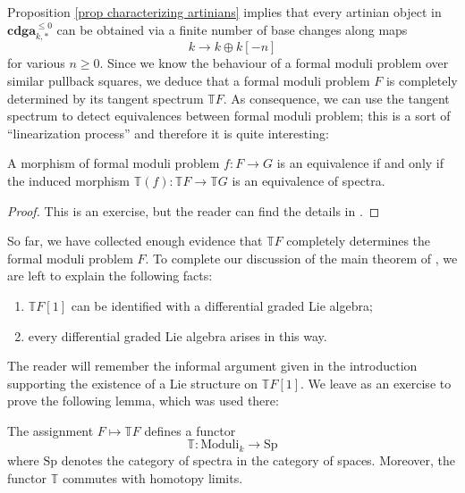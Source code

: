 \begin{refsection}
Proposition \ref{prop characterizing artinians} implies that every artinian object in $\mathbf{cdga}_{k,*}^{\le 0}$ can be obtained via a finite number of base changes along maps
\[
k \to k \oplus k[-n]
\]
for various $n \ge 0$. Since we know the behaviour of a formal moduli problem over similar pullback squares, we deduce that a formal moduli problem $F$ is completely determined by its tangent spectrum $\mathbb T F$. As consequence, we can use the tangent spectrum to detect equivalences between formal moduli problem; this is a sort of ``linearization process'' and therefore it is quite interesting:

\begin{prop}
A morphism of formal moduli problem $f \colon F \to G$ is an equivalence if and only if the induced morphism $\mathbb T(f) \colon \mathbb T F \to \mathbb T G$ is an equivalence of spectra.
\end{prop}

\begin{proof}
This is an exercise, but the reader can find the details in \cite[Proposition 1.2.10]{dagx}.
\end{proof}

So far, we have collected enough evidence that $\mathbb T F$ completely determines the formal moduli problem $F$. To complete our discussion of the main theorem of \cite{dagx}, we are left to explain the following facts:
\begin{enumerate}
\item $\mathbb T F[1]$ can be identified with a differential graded Lie algebra;
\item every differential graded Lie algebra arises in this way.
\end{enumerate}

The reader will remember the informal argument given in the introduction supporting the existence of a Lie structure on $\mathbb TF[1]$. We leave as an exercise to prove the following lemma, which was used there:

\begin{lemma}
The assignment $F \mapsto \mathbb T F$ defines a functor
\[
\mathbb T \colon \mathrm{Moduli}_k \to \mathrm{Sp}
\]
where $\mathrm{Sp}$ denotes the category of spectra in the category of spaces. Moreover, the functor $\mathbb T$ commutes with homotopy limits.
\end{lemma}


\end{refsection}
